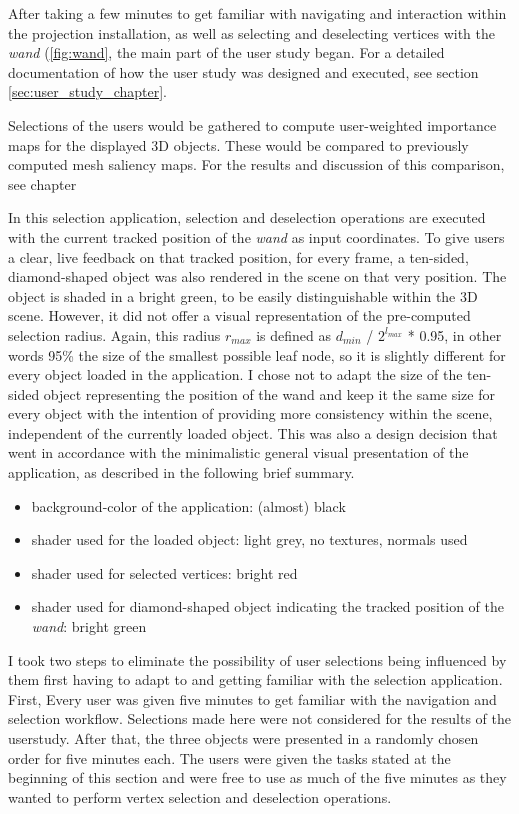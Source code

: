 After taking a few minutes to get familiar with navigating and interaction within the projection installation, as well as selecting and deselecting vertices with the \textit{wand} (\ref{fig:wand}, the main part of the user study began. For a detailed documentation of how the user study was designed and executed, see section \ref{sec:user_study_chapter}.

Selections of the users would be gathered to compute user-weighted importance maps for the displayed 3D objects. These would be compared to previously computed mesh saliency maps. For the results and discussion of this comparison, see chapter 

In this selection application, selection and deselection operations are executed with the current tracked position of the \textit{wand} as input coordinates. To give users a clear, live feedback on that tracked position, for every frame, a ten-sided, diamond-shaped object was also rendered in the scene on that very position. The object is shaded in a bright green, to be easily distinguishable within the 3D scene. However, it did not offer a visual representation of the pre-computed selection radius. Again, this radius $r_{max}$ is defined as $d_{min}$ / $2^{l_{max}}$ * 0.95, in other words 95\% the size of the smallest possible leaf node, so it is slightly different for every object loaded in the application. I chose not to adapt the size of the ten-sided object representing the position of the wand and keep it the same size for every object with the intention of providing more consistency within the scene, independent of the currently loaded object. This was also a design decision that went in accordance with the minimalistic general visual presentation of the application, as described in the following brief summary.

\begin{itemize}
	\item background-color of the application: (almost) black
	\item shader used for the loaded object: light grey, no textures, normals used
	\item shader used for selected vertices: bright red
	\item shader used for diamond-shaped object indicating the tracked position of the \textit{wand}: bright green
\end{itemize}

I took two steps to eliminate the possibility of user selections being influenced by them first having to adapt to and getting familiar with the selection application. First, Every user was given five minutes to get familiar with the navigation and selection workflow. Selections made here were not considered for the results of the userstudy. After that, the three objects were presented in a randomly chosen order for five minutes each. The users were given the tasks stated at the beginning of this section and were free to use as much of the five minutes as they wanted to perform vertex selection and deselection operations.

